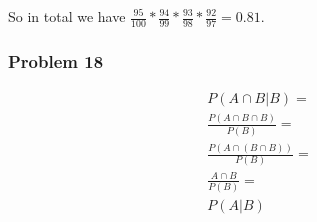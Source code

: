 \documentclass{article}
\begin{document}
So in total we have $\frac{95}{100} * \frac{94}{99} * \frac{93}{98} * \frac{92}{97} = 0.81$.

\subsubsection*{Problem 18}

\begin{gather*}
    P(A \cap B|B) = \\
    \frac{P(A \cap B \cap B)}{P(B)} = \\
    \frac{P(A \cap (B \cap B))}{P(B)} = \\
    \frac{A \cap B}{P(B)} = \\
    P(A|B)
\end{gather*}
\end{document}
